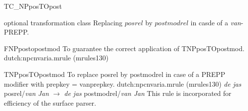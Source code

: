 \begin{mruleclass}{TC\_NPposTOpost}
\begin{classdescr}
\kind optional transformation class
\classtask Replacing $posrel$ by $postmodrel$ in casde of a {\em van}-PREPP.
\classremarks

\begin{filters}
\begin{members}
\begin{member}
 FNPpostopostmod
 To guarantee the correct application of TNPposTOpostmod.
\file dutch:npcnvaria.mrule (mrules130)
\end{member}
\end{members}

\end{filters}
\nospeedrules
\noplannedrules
\norulesnotince
\begin{comments}
\end{comments}
\end{classdescr}


\begin{members}
\begin{member}
 TNPposTOpostmod
 To replace posrel by postmodrel in case of a PREPP modifier with 
prepkey = vanprepkey.
\file dutch:npcnvaria.mrule (mrules130)
\semantics \nosemantics
\example 
{\em de jas} posrel/{\em van Jan} 
$\rightarrow$ 
{\em de jas} postmodrel/{\em van Jan} 
\remarks This rule is incorporated for efficiency of the surface parser.
\end{member}
\end{members}
\end{mruleclass}


